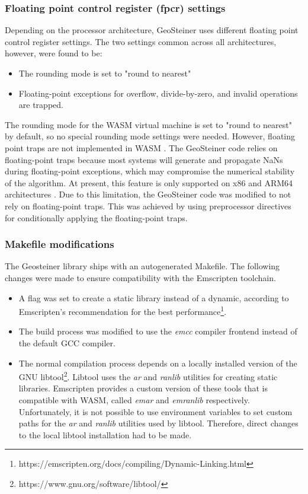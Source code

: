 \documentclass{l4proj}
\begin{document}
\subsubsection{Floating point control register (fpcr) settings}
Depending on the processor architecture, GeoSteiner uses different floating point control register settings. The two settings common across all architectures, however, were found to be:
\begin{itemize}
    \item The rounding mode is set to "round to nearest"
    \item Floating-point exceptions for overflow, divide-by-zero, and invalid operations are trapped.
\end{itemize}

The rounding mode for the WASM virtual machine is set to "round to nearest" by default, so no special rounding mode settings were needed. However, floating point traps are not implemented in WASM \citep{WASM_faqs}. The GeoSteiner code relies on floating-point traps because most systems will generate and propagate NaNs during floating-point exceptions, which may compromise the numerical stability of the algorithm. At present, this feature is only supported on x86 and ARM64 architectures \citep{Geosteiner_manual}.
Due to this limitation, the GeoSteiner code was modified to not rely on floating-point traps. This was achieved by using preprocessor directives for conditionally applying the floating-point traps.

\subsubsection{Makefile modifications}
The Geosteiner library ships with an autogenerated Makefile. The following changes were made to ensure compatibility with the Emscripten toolchain.
\begin{itemize}
    \item A flag was set to create a static library instead of a dynamic, according to Emscripten's recommendation for the best performance\footnote{https://emscripten.org/docs/compiling/Dynamic-Linking.html}.
    \item The build process was modified to use the \textit{emcc} compiler frontend instead of the default GCC compiler.
    \item The normal compilation process depends on a locally installed version of the GNU libtool\footnote{https://www.gnu.org/software/libtool/}. Libtool uses the \textit{ar} and \textit{ranlib} utilities for creating static libraries. Emscripten provides a custom version of these tools that is compatible with WASM, called \textit{emar} and \textit{emranlib} respectively. Unfortunately, it is not possible to use environment variables to set custom paths for the \textit{ar} and \textit{ranlib} utilities used by libtool. Therefore, direct changes to the local libtool installation had to be made.
\end{itemize}
\end{document}
